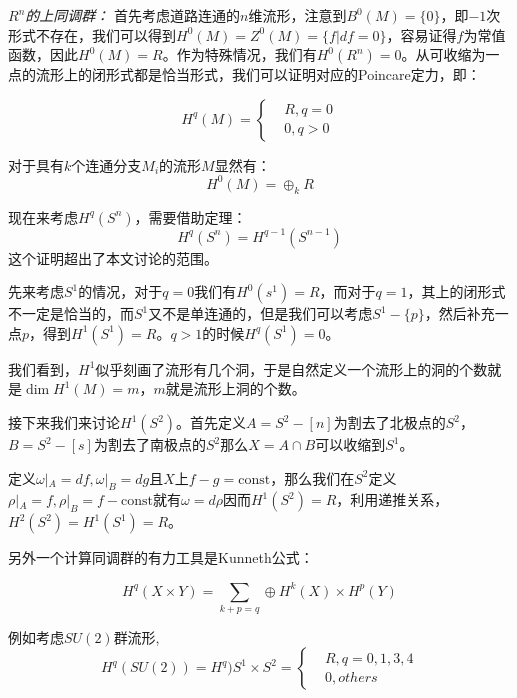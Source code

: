 \documentclass[supercite]{HustGraduPaper}
\begin{document}
\begin{appendices}
		\textit{$R^n$的上同调群：} 首先考虑道路连通的$n$维流形，注意到$B^0(M) = \{0\}$，即$-1$次形式不存在，我们可以得到$H^0(M) = Z^0(M) = \{f| df = 0\}$，容易证得$f$为常值函数，因此$H^0(M) = R$。作为特殊情况，我们有$H^0(R^n) = 0$。从可收缩为一点的流形上的闭形式都是恰当形式，我们可以证明对应的Poincare定力，即：
		
		\begin{equation}
		H^q(M)  = \begin{cases}
		&R, q= 0\\
		&0, q>0
		\end{cases}
		\end{equation}
		
		对于具有$k$个连通分支$M_i$的流形$M$显然有：
		\begin{equation}
		H^0(M) = \oplus_k R
		\end{equation}
		
		现在来考虑$H^q(S^n)$，需要借助定理：
		\begin{equation}
		H^q(S^n) = H^{q-1}(S^{n-1})
		\end{equation}
		这个证明超出了本文讨论的范围。
		
		先来考虑$S^1$的情况，对于$q = 0$我们有$H^0(s^1) = R$，而对于$q = 1$，其上的闭形式不一定是恰当的，而$S^1$又不是单连通的，但是我们可以考虑$S^1 - \{p\}$，然后补充一点$p$，得到$H^1(S^1) = R$。$q>1$的时候$H^q(S^1) = 0$。
		
		我们看到，$H^1$似乎刻画了流形有几个洞，于是自然定义一个流形上的洞的个数就是$\dim H^1(M) = m$，$m$就是流形上洞的个数。
		
		接下来我们来讨论$H^1(S^2)$。首先定义$A = S^2 - [n]$为割去了北极点的$S^2$，$B = S^2 - [s]$为割去了南极点的$S^2$那么$X= A \cap B$可以收缩到$S^1$。
		
		定义$\omega|_A = df, \omega|_B = dg$且$X$上$f-g = \text{const}$，那么我们在$S^2$定义$\rho|_A = f, \rho|_B= f - \text{const}$就有$\omega = d\rho$因而$H^1(S^2) = R$，利用递推关系，$H^2(S^2) = H^1(S^1) = R$。
		
		另外一个计算同调群的有力工具是Kunneth公式：
		
		\begin{equation}
		H^q(X\times Y) = \sum_{k+p = q} \oplus H^k(X) \times H^p(Y)
		\end{equation}
		
		例如考虑$SU(2)$群流形,
		\begin{equation}
		H^q(SU(2)) = H^q)S^1\times S^2 = \begin{cases}
		&R,q=0,1,3,4\\
		&0,others
		\end{cases}
		\end{equation}
		

\end{appendices}
\end{document}
